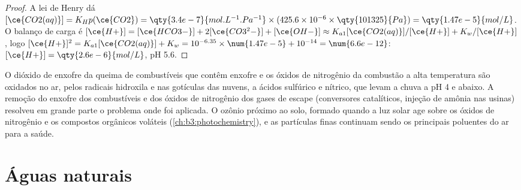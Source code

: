 \begin{proof}
A lei de Henry dá $[\ce{CO2(aq)}] = K_Hp(\ce{CO2}) = \qty{3.4e-7}{mol.L^{-1}.Pa^{-1}} \times (425.6 \times 10^{-6} \times \qty{101325}{Pa}) = \qty{1.47e-5}{mol/L}$. O
balanço de carga é $[\ce{H+}] = [\ce{HCO3-}] + 2[\ce{CO3^2-}] + [\ce{OH-}] \approx K_{a1}[\ce{CO2(aq)}]/[\ce{H+}] + K_w/[\ce{H+}]$, logo
$[\ce{H+}]^2 = K_{a1}[\ce{CO2(aq)}] + K_w = 10^{-6.35} \times \num{1.47e-5} + 10^{-14} = \num{6.6e-12}$: $[\ce{H+}] = \qty{2.6e-6}{mol/L}$, pH 5.6.
\end{proof}

O dióxido de enxofre da queima de combustíveis que contêm enxofre e os óxidos de nitrogênio da
combustão a alta temperatura são oxidados no ar, pelos radicais hidroxila e nas gotículas das
nuvens, a ácidos sulfúrico e nítrico, que levam a chuva a pH 4 e abaixo.
A remoção do enxofre dos combustíveis e dos óxidos de nitrogênio dos gases de escape (conversores
catalíticos, injeção de amônia nas usinas) resolveu em grande parte o problema
onde foi aplicada. O ozônio próximo ao solo, formado quando a luz solar age sobre os
óxidos de nitrogênio e os compostos orgânicos voláteis (\cref{ch:b3:photochemistry}), e
as partículas finas continuam sendo os principais poluentes do ar para a saúde.

\section{Águas naturais}


